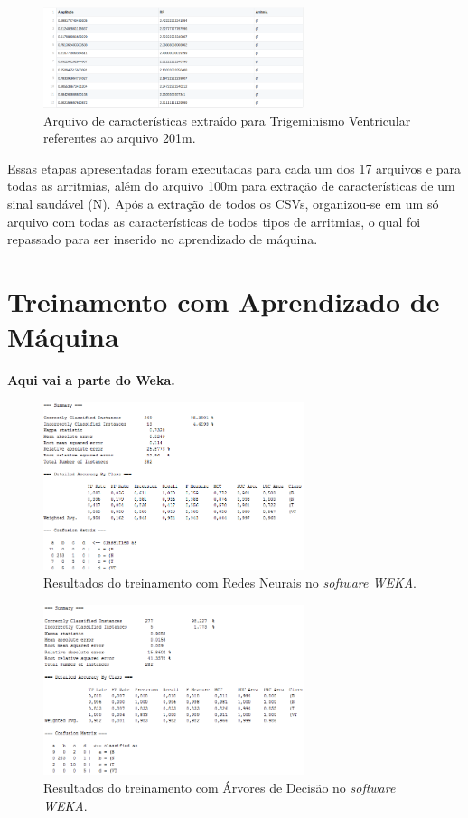 \documentclass[conference]{IEEEtran}
\begin{document}
\begin{figure}[!h]
	\centering
	\includegraphics[width=3in]{img/trigeminyFeaturesExtractedCSVExample}
	\caption{Arquivo de características extraído para Trigeminismo Ventricular referentes ao arquivo 201m.}
	\label{trigeminyFeaturesExtractedCSVExample}
\end{figure}

Essas etapas apresentadas foram executadas para cada um dos 17 arquivos e para todas as arritmias, além do arquivo 100m para extração de características de um sinal saudável (N). Após a extração de todos os CSVs, organizou-se em um só arquivo com todas as características de todos tipos de arritmias, o qual foi repassado para ser inserido no aprendizado de máquina.

\section{Treinamento com Aprendizado de Máquina}

\textbf{Aqui vai a parte do Weka.}

\begin{figure}[!h]
	\centering
	\includegraphics[width=3in]{img/wekaResultANN8020}
	\caption{Resultados do treinamento com Redes Neurais no \textit{software WEKA}.}
	\label{wekaResultANN8020}
\end{figure}

\begin{figure}[!h]
	\centering
	\includegraphics[width=3in]{img/wekaResultRandomForest8020}
	\caption{Resultados do treinamento com Árvores de Decisão no \textit{software WEKA}.}
	\label{wekaResultRandomForest8020}
\end{figure}
\end{document}
